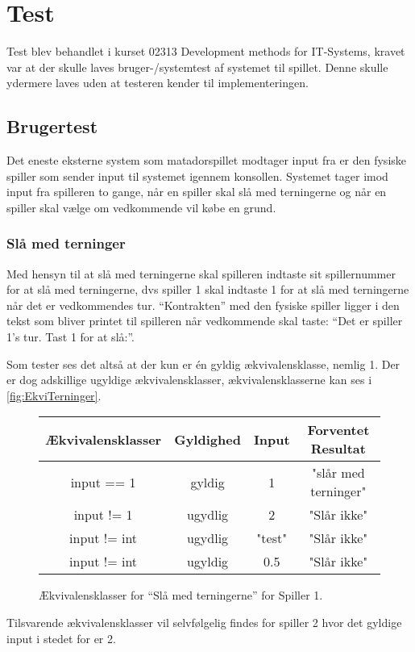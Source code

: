 \chapter{Test} \label{chap:Test}
Test blev behandlet i kurset 02313 Development methods for IT-Systems, kravet var at der skulle laves bruger-/systemtest af systemet til spillet. Denne skulle ydermere laves uden at testeren kender til implementeringen.

\section{Brugertest}
Det eneste eksterne system som matadorspillet modtager input fra er den fysiske spiller som sender input til systemet igennem konsollen. Systemet tager imod input fra spilleren to gange, når en spiller skal slå med terningerne og når en spiller skal vælge om vedkommende vil købe en grund.

\subsection{Slå med terninger}
Med hensyn til at slå med terningerne skal spilleren indtaste sit spillernummer for at slå med terningerne, dvs spiller 1 skal indtaste 1 for at slå med terningerne når det er vedkommendes tur. \enquote{Kontrakten} med den fysiske spiller ligger i den tekst som bliver printet til spilleren når vedkommende skal taste: \enquote{Det er spiller 1's tur. Tast 1 for at slå:}.

Som tester ses det altså at der kun er én gyldig ækvivalensklasse, nemlig 1. Der er dog adskillige ugyldige ækvivalensklasser, ækvivalensklasserne kan ses i \vref{fig:EkviTerninger}.
\begin{figure}
\caption{Ækvivalensklasser for \enquote{Slå med terningerne} for Spiller 1.}
\label{fig:EkviTerninger}
\centering
\begin{tabular}{cccc}
Ækvivalensklasser & Gyldighed & Input  & Forventet Resultat \\
\hline
input == 1 & gyldig & 1 & "slår med terninger"\\ 
input != 1 & ugydlig & 2 & "Slår ikke"\\ 
input != int & ugydlig & "test" & "Slår ikke"\\
input != int & ugyldig & 0.5 & "Slår ikke" \\
\end{tabular} 
\end{figure}

Tilsvarende ækvivalensklasser vil selvfølgelig findes for spiller 2 hvor det gyldige input i stedet for er 2.

